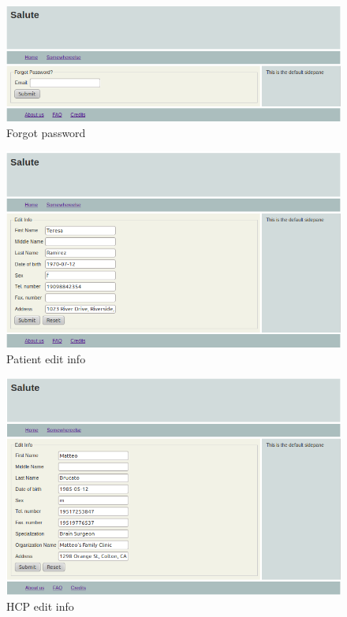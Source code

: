 \begin{figure}
\includegraphics[scale=0.6]{screenshots/forgot_pwd.png}
\caption{Forgot password}
\end{figure}

\begin{figure}
\includegraphics[scale=0.6]{screenshots/pat_info.png}
\caption{Patient edit info}
\end{figure}

\begin{figure}
\includegraphics[scale=0.6]{screenshots/hcp_edit_info.png}
\caption{HCP edit info}
\end{figure}

